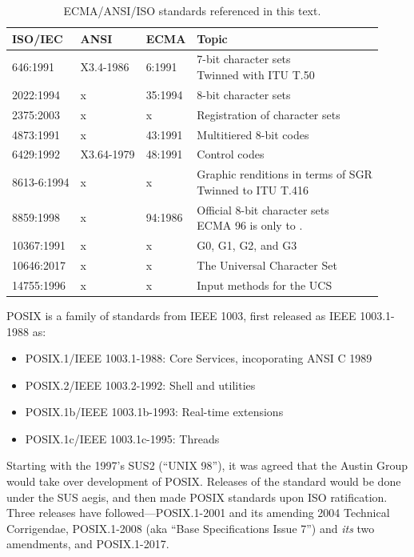 \documentclass[letterpaper,10pt]{article}
\newenvironment{denseitemize}{
  \begin{itemize}
      \setlength{\itemsep}{0pt}
}{
  \end{itemize}
}
\begin{document}
\begin{appendices}
\vspace{.5in}

\begin{table}[!h]
  \centering
  \begin{tabular}{|l|l|l|l|}
    \hline
    ISO/IEC & ANSI & ECMA & Topic \\
    \hline
    \hline
    646:1991 & X3.4-1986 & 6:1991 & \makecell[l]{7-bit character sets \\ Twinned with ITU T.50} \\
    \hline
    2022:1994 & x & 35:1994 & 8-bit character sets \\
    \hline
    2375:2003 & x & x & Registration of character sets \\
    \hline
    4873:1991 & x & 43:1991 & Multitiered 8-bit codes \\
    \hline
    6429:1992 & X3.64-1979 & 48:1991 & Control codes \\
    \hline
    8613-6:1994 & x & x & \makecell[l]{Graphic renditions in terms of SGR \\Twinned to ITU T.416} \\
    \hline
    8859:1998 & x & 94:1986 & \makecell[l]{Official 8-bit character sets\\ECMA 96 is only \textnumero 1 to \textnumero 4.} \\
    \hline
    10367:1991 & x & x & G0, G1, G2, and G3 \\
    \hline
    10646:2017 & x & x & The Universal Character Set \\
    \hline
    14755:1996 & x & x & Input methods for the UCS \\
    \hline
  \end{tabular}
  \caption{ECMA/ANSI/ISO standards referenced in this text.}
  \label{table:standards}
\end{table}

\vspace{.5in}

POSIX is a family of standards from IEEE 1003, first released as IEEE 1003.1-1988 as:
\begin{denseitemize}
\item{POSIX.1/IEEE 1003.1-1988: Core Services, incoporating ANSI C 1989}
\item{POSIX.2/IEEE 1003.2-1992: Shell and utilities}
\item{POSIX.1b/IEEE 1003.1b-1993: Real-time extensions}
\item{POSIX.1c/IEEE 1003.1c-1995: Threads}
\end{denseitemize}
Starting with the 1997's SUS2 (``UNIX 98''), it was agreed that the Austin
Group would take over development of POSIX. Releases of the standard would be
done under the SUS aegis, and then made POSIX standards upon ISO ratification.
Three releases have followed---POSIX.1-2001 and its amending 2004 Technical Corrigendae,
POSIX.1-2008 (aka ``Base Specifications Issue 7'') and \textit{its} two amendments,
and POSIX.1-2017.


\end{appendices}
\end{document}
